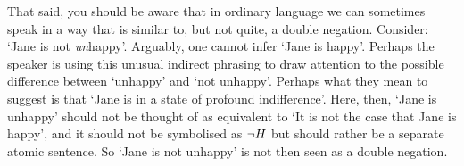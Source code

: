 %

That said, you should be aware that
in ordinary language we can sometimes speak in a way that is similar to, but not quite, a double negation.
Consider: `Jane is not \emph{un}happy'. Arguably, one cannot infer `Jane is happy'.
Perhaps the speaker is using this unusual indirect phrasing to draw attention to the possible difference between `unhappy' and `not unhappy'.
Perhaps what they mean to suggest is that
`Jane is in a state of profound indifference'.
Here, then, `Jane is unhappy' should not be thought of as equivalent to `It is not the case that Jane is happy', and it should not be symbolised as $\neg H$ but should rather be a separate atomic sentence. So `Jane is not unhappy' is not then seen as a double negation.
%


%
